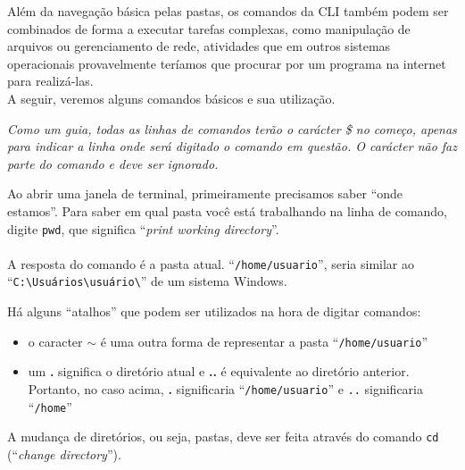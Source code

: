 \documentclass{handout_utfpr}
\newcommand{\com}[1]{
\colorbox{light-gray}{\texttt{\pbox{\textwidth}{\$ #1}}}
}
\newcommand{\cominline}[1]{
\colorbox{light-gray}{\texttt{\pbox{\textwidth}{#1}}}
}
\begin{document}
Além da navegação básica pelas pastas, os comandos da CLI também podem ser combinados de forma a executar tarefas complexas, como manipulação de arquivos ou gerenciamento de rede, atividades que em outros sistemas operacionais provavelmente teríamos que procurar por um programa na internet para realizá-las.\\

A seguir, veremos alguns comandos básicos e sua utilização.


{\small \it Como um guia, todas as linhas de comandos terão o carácter \$ no começo, apenas para indicar a linha onde será digitado o comando em questão. O carácter não faz parte do comando e deve ser ignorado.\\}

Ao abrir uma janela de terminal, primeiramente precisamos saber ``onde estamos''. Para saber em qual pasta você está trabalhando na linha de comando, digite \texttt{pwd}, que significa ``\textit{print working directory}''.\\

\com{pwd\\/home/usuario}\\

A resposta do comando é a pasta atual. ``\texttt{/home/usuario}'', seria similar ao ``\texttt{C:\textbackslash Usuários\textbackslash usuário\textbackslash}'' de um sistema Windows.

Há alguns ``atalhos'' que podem ser utilizados na hora de digitar comandos:
\begin{itemize}
\item o caracter \textbf{$\sim$} é uma outra forma de representar a pasta ``\texttt{/home/usuario}''
\item um \textbf{.} significa o diretório atual e \textbf{..} é equivalente ao diretório anterior. Portanto, no caso acima, \textbf{.} significaria ``\texttt{/home/usuario}'' e \texttt{..} significaria ``\texttt{/home}''
\end{itemize}
A mudança de diretórios, ou seja, pastas, deve ser feita através do comando \texttt{cd} (``\textit{change directory}'').
\end{document}
